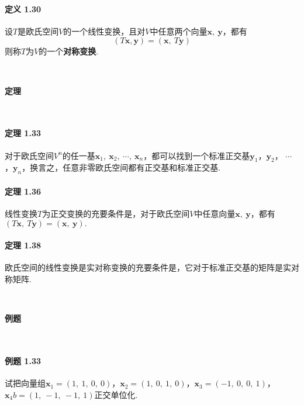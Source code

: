 \documentclass[12pt, a4paper, oneside, fontset=none]{ctexart}
\begin{document}
\paragraph*{定义 1.30} 设$T$是欧氏空间$V$的一个线性变换，且对$V$中任意两个向量$\bm{x},\ \bm{y}$，都有
\[
    (T\bm{x}, \bm{y}) = (\bm{x},\ T\bm{y})
\]
则称$T$为$V$的一个\textbf{对称变换}.

\par \ \par

\centerline{\large{\textbf{定理}}} \ \par

\paragraph*{定理 1.33} 对于欧氏空间$V^n$的任一基$\bm{x}_1,\ \bm{x}_2,\ \cdots, \ \bm{x}_n$，都可以找到一个标准正交基$\bm{y}_1$，$\bm{y}_2$，
$\cdots$，$\bm{y}_n$，换言之，任意非零欧氏空间都有正交基和标准正交基.

\paragraph*{定理 1.36} 线性变换$T$为正交变换的充要条件是，对于欧氏空间$V$中任意向量$\bm{x},\ \bm{y}$，都有
$(T\bm{x},\ T\bm{y}) = (\bm{x},\ \bm{y}).$

\paragraph*{定理 1.38} 欧氏空间的线性变换是实对称变换的充要条件是，它对于标准正交基的矩阵是实对
称矩阵.

\par \ \par

\centerline{\large{\textbf{例题}}} \ \par

\paragraph*{例题 1.33} 试把向量组$\bm{x}_1 = (1,\ 1,\ 0,\ 0)$，$\bm{x}_2 = (1,\ 0,\ 1,\ 0)$，$\bm{x}_3 = (-1,\ 0,\ 0,\ 1)$，$\bm{x}_4b =
    (1,\ -1,\ -1,\ 1)$正交单位化.
\end{document}
